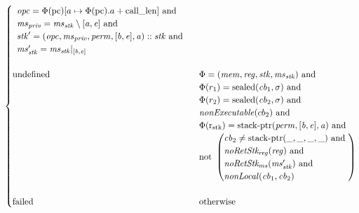 \documentclass[a4paper]{article}
\newcommand{\update}[2]{[#1 \mapsto #2]}
\newcommand{\shareddom}[1]{\mathrm{#1}}
\newcommand{\perm}{\var{perm}}
\newcommand{\stkptr}[1]{\mathrm{stack\text{-}ptr}(#1)}
\newcommand{\sealed}[1]{\shareddom{sealed}(#1)}
\newcommand{\failed}{\mathrm{failed}}
\newcommand{\tundefined}{\mathrm{undefined}}
\newcommand{\var}[1]{\mathit{#1}}
\newcommand{\reg}{\var{reg}}
\newcommand{\mem}{\var{mem}}
\newcommand{\ms}{\var{ms}}
\newcommand{\stk}{\var{stk}}
\newcommand{\priv}{\var{priv}}
\newcommand{\opc}{\var{opc}}
\newcommand{\cb}{\var{cb}}
\newcommand{\baddr}{\var{b}}
\newcommand{\eaddr}{\var{e}}
\newcommand{\aaddr}{\var{a}}
\newcommand{\stdrng}{[\baddr,\eaddr]}
\newcommand{\constant}[1]{\mathrm{#1}}
\newcommand{\calllen}{\constant{call\_len}}
\newcommand{\pcreg}{\mathrm{pc}}
\newcommand{\rstk}{\mathrm{r}_\mathrm{stk}}
\newcommand{\plainfun}[2]{
  \ifthenelse{\equal{#2}{}}
  {\mathit{#1}}
  {\mathit{#1}(#2)}
}
\newcommand{\nonExec}[1]{\plainfun{nonExecutable}{#1}}
\newcommand{\nonLoc}[1]{\plainfun{nonLocal}{#1}}
\newcommand{\noRetStkReg}[1]{\plainfun{noRetStk_{reg}}{#1}}
\newcommand{\noRetStkMs}[1]{\plainfun{noRetStk_{ms}}{#1}}
\begin{document}
\begin{align*}
\begin{cases}
\begin{array}[t]{l}
                                        \opc = \Phi(\pcreg)\update{a}{\Phi(\pcreg).a+\calllen} \text{ and } \\
                                        \ms_\priv = \ms_\stk \setminus [\aaddr,\eaddr] \text{ and } \\
                                        \stk' = (\opc,\ms_\priv,\perm,\stdrng,\aaddr) :: \stk \text{ and } \\
                                        \ms_\stk' = \ms_\stk |_{[\baddr,\eaddr]}
                                      \end{array}\\
                                      & \\
      \tundefined & \arraycolsep=0pt
                                      \begin{array}[t]{l}
                                        \Phi = (\mem,\reg,\stk,\ms_\stk) \text{ and } \\
                                        \Phi(r_1) = \sealed{\cb_1,\sigma} \text{ and } \\
                                        \Phi(r_2) = \sealed{\cb_2,\sigma} \text{ and } \\
                                        \nonExec{cb_2} \text{ and } \\
                                        \Phi(\rstk) = \stkptr{\perm, \stdrng, \aaddr} \text{ and } \\
                                        \text{not } \arraycolsep=0pt
                                        \left(\begin{array}{l}
                                          \cb_2 \neq \stkptr{\_,\_,\_,\_} \text{ and } \\
                                          \noRetStkReg{\reg} \text{ and } \\
                                          \noRetStkMs{\ms_\stk'} \text{ and } \\
                                          \nonLoc{\cb_1,\cb_2}
                                        \end{array} \right)
                                      \end{array}\\
                                      & \\
      \failed & \text{otherwise}
    \end{cases}
\end{align*}
\end{document}
